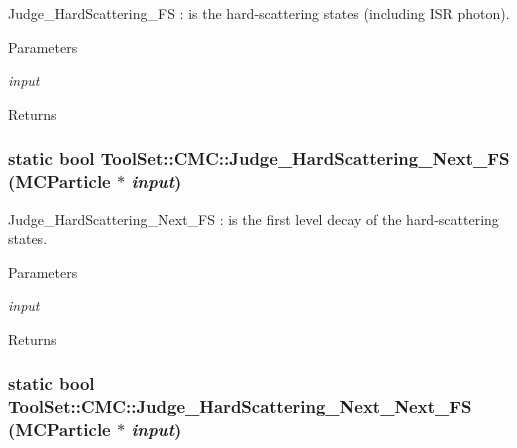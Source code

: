 Judge\_\-HardScattering\_\-FS : is the hard-\/scattering states (including ISR photon). 
\begin{DoxyParams}{Parameters}
\item[{\em input}]\end{DoxyParams}
\begin{DoxyReturn}{Returns}

\end{DoxyReturn}
\hypertarget{classToolSet_1_1CMC_af28ed4c00c5b936aa0660253bd4af35b}{
\subsubsection[{Judge\_\-HardScattering\_\-Next\_\-FS}]{\setlength{\rightskip}{0pt plus 5cm}static bool ToolSet::CMC::Judge\_\-HardScattering\_\-Next\_\-FS (MCParticle $\ast$ {\em input})}}
\label{classToolSet_1_1CMC_af28ed4c00c5b936aa0660253bd4af35b}


Judge\_\-HardScattering\_\-Next\_\-FS : is the first level decay of the hard-\/scattering states. 
\begin{DoxyParams}{Parameters}
\item[{\em input}]\end{DoxyParams}
\begin{DoxyReturn}{Returns}

\end{DoxyReturn}
\hypertarget{classToolSet_1_1CMC_a20029373a30ff4642dfbe5ac879ee0ff}{
\subsubsection[{Judge\_\-HardScattering\_\-Next\_\-Next\_\-FS}]{\setlength{\rightskip}{0pt plus 5cm}static bool ToolSet::CMC::Judge\_\-HardScattering\_\-Next\_\-Next\_\-FS (MCParticle $\ast$ {\em input})}}
\label{classToolSet_1_1CMC_a20029373a30ff4642dfbe5ac879ee0ff}


